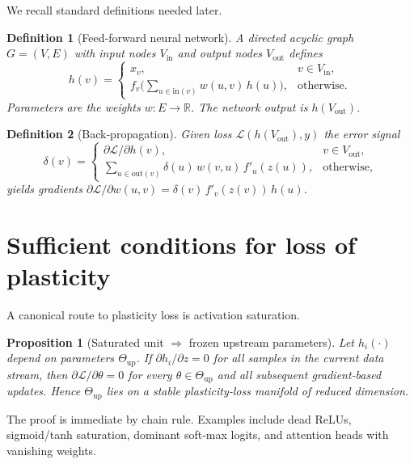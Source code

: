 \documentclass[11pt]{article}
\newcommand{\Loss}{\mathcal{L}}
\newcommand{\R}{\mathbb{R}}
\newtheorem{definition}{Definition}[section]
\newtheorem{proposition}{Proposition}[section]
\begin{document}
We recall standard definitions needed later.

\begin{definition}[Feed‑forward neural network]
A directed acyclic graph $G=(V,E)$ with input nodes $V_{\text{in}}$ and output nodes $V_{\text{out}}$ defines
\[
h(v)=
\begin{cases}
x_v, & v\in V_{\text{in}},\\
f_v\!\bigl(\sum_{u\!\in\!\mathrm{in}(v)}w(u,v)\,h(u)\bigr), &\text{otherwise}.
\end{cases}
\]
Parameters are the weights $w:E\to\R$.  The network output is $h(V_{\text{out}})$.
\end{definition}

\begin{definition}[Back‑propagation]
Given loss $\Loss(h(V_{\text{out}}),y)$ the error signal
\[
\delta(v)=
\begin{cases}
\partial\Loss/\partial h(v), & v\in V_{\text{out}},\\[4pt]
\displaystyle\sum_{u\in\mathrm{out}(v)}\delta(u)\,w(v,u)\,f'_u(z(u)), &\text{otherwise},
\end{cases}
\]
yields gradients $\partial\Loss/\partial w(u,v)=\delta(v)\,f'_v(z(v))\,h(u)$.\qedhere
\end{definition}

\section{Sufficient conditions for loss of plasticity}
\label{sec:frozen}

A canonical route to plasticity loss is activation saturation.

\begin{proposition}[Saturated unit $\Rightarrow$ frozen upstream parameters]
\label{prop:saturated}
Let $h_i(\cdot)$ depend on parameters $\Theta_{\text{up}}$.  If
\(
\partial h_i/\partial z = 0
\)
for all samples in the current data stream, then
\(
\partial\Loss/\partial\theta = 0
\)
for every $\theta\in\Theta_{\text{up}}$ and all subsequent gradient‑based updates.  Hence $\Theta_{\text{up}}$ lies on a stable plasticity‑loss manifold of reduced dimension.
\end{proposition}

The proof is immediate by chain rule.  Examples include dead ReLUs, sigmoid/tanh saturation, dominant soft‑max logits, and attention heads with vanishing weights.

\end{document}
